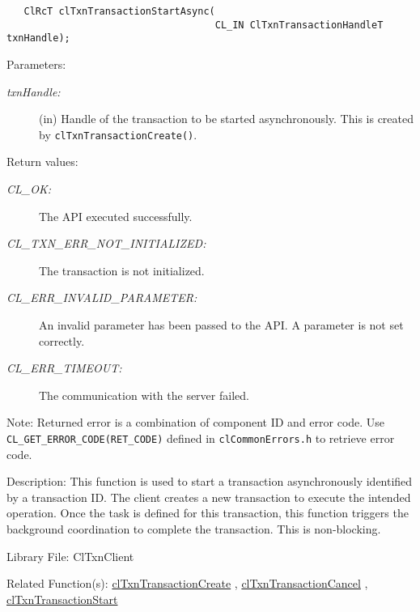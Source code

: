 \begin{flushleft}
\begin{Desc}
\footnotesize\begin{verbatim}   ClRcT clTxnTransactionStartAsync(
                               		CL_IN ClTxnTransactionHandleT txnHandle);
\end{verbatim}
\normalsize
\end{Desc}
\begin{Desc}
\item[Parameters:]
\begin{description}
\item[{\em txn\-Handle:}](in) Handle of the transaction to be started asynchronously. This is created by 
{\tt{clTxnTransactionCreate()}}.\end{description}
\end{Desc}
\begin{Desc}
\item[Return values:]
\begin{description}
\item[{\em CL\_\-OK:}]The API executed successfully. \item[{\em CL\_\-TXN\_\-ERR\_\-NOT\_\-INITIALIZED:}]The transaction is not initialized. 
\item[{\em CL\_\-ERR\_\-INVALID\_\-PARAMETER:}]An invalid parameter has been passed to the API. A parameter is not set correctly. 
\item[{\em CL\_\-ERR\_\-TIMEOUT:}]The communication with the server failed.\end{description}
\end{Desc}
\begin{Desc}
\item[Note:]Returned error is a combination of component ID and error code. Use {\tt{CL\_\-GET\_\-ERROR\_\-CODE(RET\_\-CODE)}} defined in 
{\tt{clCommonErrors.h}} to retrieve error code.\end{Desc}
\begin{Desc}
\item[Description:]This function is used to start a transaction asynchronously identified by a transaction ID. The client creates a new transaction 
to execute the intended operation. Once the task is defined for this transaction, this function triggers the background coordination to complete the 
transaction. This is non-blocking.\end{Desc}
\begin{Desc}
\item[Library File:]Cl\-Txn\-Client\end{Desc}
\begin{Desc}
\item[Related Function(s):]\hyperlink{pagetxn103}{cl\-Txn\-Transaction\-Create} , \hyperlink{pagetxn104}{cl\-Txn\-Transaction\-Cancel} , 
\hyperlink{pagetxn105}{cl\-Txn\-Transaction\-Start} \end{Desc}
\newpage



\end{flushleft}
